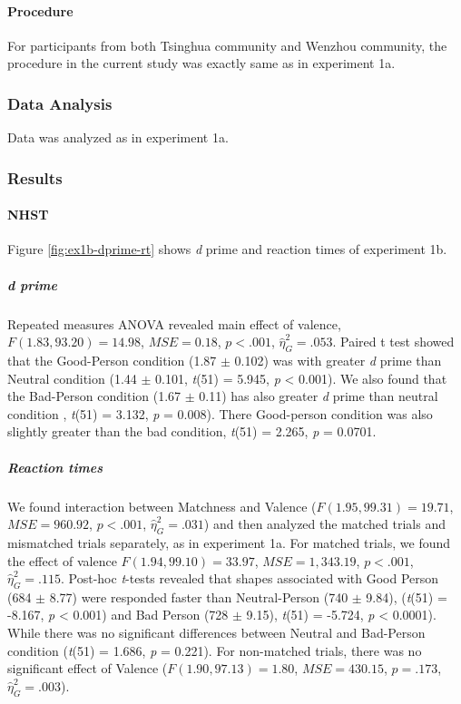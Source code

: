\documentclass[
  english,
  man]{apa6}
\let\oldparagraph\paragraph
\renewcommand{\paragraph}[1]{\oldparagraph{#1}\mbox{}}
\let\oldsubparagraph\subparagraph
\renewcommand{\subparagraph}[1]{\oldsubparagraph{#1}\mbox{}}
\begin{document}
\hypertarget{procedure-1}{%
\paragraph{Procedure}\label{procedure-1}}

For participants from both Tsinghua community and Wenzhou community, the procedure in the current study was exactly same as in experiment 1a.

\hypertarget{data-analysis-2}{%
\subsubsection{Data Analysis}\label{data-analysis-2}}

Data was analyzed as in experiment 1a.

\hypertarget{results-1}{%
\subsubsection{Results}\label{results-1}}

\hypertarget{nhst}{%
\paragraph{NHST}\label{nhst}}

Figure \ref{fig:ex1b-dprime-rt} shows \emph{d} prime and reaction times of experiment 1b.

\hypertarget{d-prime-1}{%
\subparagraph{d prime}\label{d-prime-1}}

Repeated measures ANOVA revealed main effect of valence, \(F(1.83, 93.20) = 14.98\), \(\mathit{MSE} = 0.18\), \(p < .001\), \(\hat{\eta}^2_G = .053\). Paired t test showed that the Good-Person condition (1.87 \(\pm\) 0.102) was with greater \emph{d} prime than Neutral condition (1.44 \(\pm\) 0.101, \emph{t}(51) = 5.945, \emph{p} \textless{} 0.001). We also found that the Bad-Person condition (1.67 \(\pm\) 0.11) has also greater \emph{d} prime than neutral condition , \emph{t}(51) = 3.132, \emph{p} = 0.008). There Good-person condition was also slightly greater than the bad condition, \emph{t}(51) = 2.265, \emph{p} = 0.0701.

\hypertarget{reaction-times-1}{%
\subparagraph{Reaction times}\label{reaction-times-1}}

We found interaction between Matchness and Valence (\(F(1.95, 99.31) = 19.71\), \(\mathit{MSE} = 960.92\), \(p < .001\), \(\hat{\eta}^2_G = .031\)) and then analyzed the matched trials and mismatched trials separately, as in experiment 1a. For matched trials, we found the effect of valence \(F(1.94, 99.10) = 33.97\), \(\mathit{MSE} = 1,343.19\), \(p < .001\), \(\hat{\eta}^2_G = .115\). Post-hoc \emph{t}-tests revealed that shapes associated with Good Person (684 \(\pm\) 8.77) were responded faster than Neutral-Person (740 \(\pm\) 9.84), (\emph{t}(51) = -8.167, \emph{p} \textless{} 0.001) and Bad Person (728 \(\pm\) 9.15), \emph{t}(51) = -5.724, \emph{p} \textless{} 0.0001). While there was no significant differences between Neutral and Bad-Person condition (\emph{t}(51) = 1.686, \emph{p} = 0.221). For non-matched trials, there was no significant effect of Valence (\(F(1.90, 97.13) = 1.80\), \(\mathit{MSE} = 430.15\), \(p = .173\), \(\hat{\eta}^2_G = .003\)).
\end{document}
